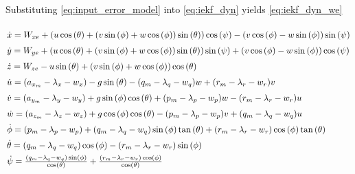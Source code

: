Substituting \autoref{eq:input_error_model} into \autoref{eq:iekf_dyn} yields \autoref{eq:iekf_dyn_we}

\begin{equation}
    \arraycolsep=1.pt\def\arraystretch{1.5}
    \begin{array}{*{20}{l}}
        {\dot x = {W_{xe}} + \left( {u\cos \left( \theta  \right) + \left( {v\sin \left( \phi  \right) + w\cos \left( \phi  \right)} \right)\sin \left( \theta  \right)} \right)\cos \left( \psi  \right) - \left( {v\cos \left( \phi  \right) - w\sin \left( \phi  \right)} \right)\sin \left( \psi  \right)}\\
        {\dot y = {W_{ye}} + \left( {u\cos \left( \theta  \right) + \left( {v\sin \left( \phi  \right) + w\cos \left( \phi  \right)} \right)\sin \left( \theta  \right)} \right)\sin \left( \psi  \right) + \left( {v\cos \left( \phi  \right) - w\sin \left( \phi  \right)} \right)\cos \left( \psi  \right)}\\
        {\dot z = {W_{ze}} - u\sin \left( \theta  \right) + \left( {v\sin \left( \phi  \right) + w\cos \left( \phi  \right)} \right)\cos \left( \theta  \right)}\\
        {\dot u = ({a_{{x_m}}} - {\lambda _x} - {w_x}) - g\sin \left( \theta  \right) - ({q_m} - {\lambda _q} - {w_q})w + ({r_m} - {\lambda _r} - {w_r})v}\\
        {\dot v = ({a_{{y_m}}} - {\lambda _y} - {w_y}) + g\sin \left( \phi  \right)\cos \left( \theta  \right) + ({p_m} - {\lambda _p} - {w_p})w - ({r_m} - {\lambda _r} - {w_r})u}\\
        {\dot w = ({a_{{z_m}}} - {\lambda _z} - {w_z}) + g\cos \left( \phi  \right)\cos \left( \theta  \right) - ({p_m} - {\lambda _p} - {w_p})v + ({q_m} - {\lambda _q} - {w_q})u}\\
        {\dot \phi  = ({p_m} - {\lambda _p} - {w_p}) + ({q_m} - {\lambda _q} - {w_q})\sin \left( \phi  \right)\tan \left( \theta  \right) + ({r_m} - {\lambda _r} - {w_r})\cos \left( \phi  \right)\tan \left( \theta  \right)}\\
        {\dot \theta  = ({q_m} - {\lambda _q} - {w_q})\cos \left( \phi  \right) - ({r_m} - {\lambda _r} - {w_r})\sin \left( \phi  \right)}\\
        {\dot \psi  = \frac{{({q_m} - {\lambda _q} - {w_q})\sin \left( \phi  \right)}}{{\cos \left( \theta  \right)}} + \frac{{({r_m} - {\lambda _r} - {w_r})\cos \left( \phi  \right)}}{{\cos \left( \theta  \right)}}}
    \end{array}
    \label{eq:iekf_dyn_we}
\end{equation}

